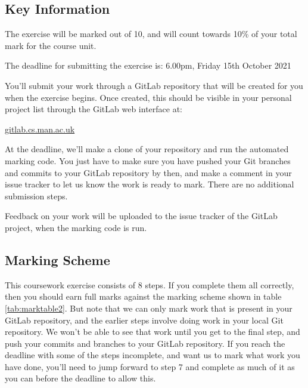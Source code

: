 \documentclass[
]{book}
\begin{document}
\hypertarget{keyinfo}{%
\subsection{Key Information}\label{keyinfo}}

The exercise will be marked out of 10, and will count towards 10\% of your total mark for the course unit.

The deadline for submitting the exercise is: 6.00pm, Friday 15th October 2021

You'll submit your work through a GitLab repository that will be created for you when the exercise begins. Once created, this should be visible in your personal project list through the GitLab web interface at:

\href{https://gitlab.cs.man.ac.uk}{gitlab.cs.man.ac.uk}

At the deadline, we'll make a clone of your repository and run the automated marking code. You just have to make sure you have pushed your Git branches and commits to your GitLab repository by then, and make a comment in your issue tracker to let us know the work is ready to mark. There are no additional submission steps.

Feedback on your work will be uploaded to the issue tracker of the GitLab project, when the marking code is run.

\hypertarget{markingscheme2}{%
\subsection{Marking Scheme}\label{markingscheme2}}

This coursework exercise consists of 8 steps. If you complete them all correctly, then you should earn full marks against the marking scheme shown in table \ref{tab:marktable2}. But note that we can only mark work that is present in your GitLab repository, and the earlier steps involve doing work in your local Git repository. We won't be able to see that work until you get to the final step, and push your commits and branches to your GitLab repository. If you reach the deadline with some of the steps incomplete, and want us to mark what work you have done, you'll need to jump forward to step 7 and complete as much of it as you can before the deadline to allow this.
\end{document}
